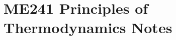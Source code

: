\documentclass{article}
\begin{document}
	\section*{ME241 Principles of Thermodynamics Notes}
	
	

    \newpage 

    
    
	
\end{document}
